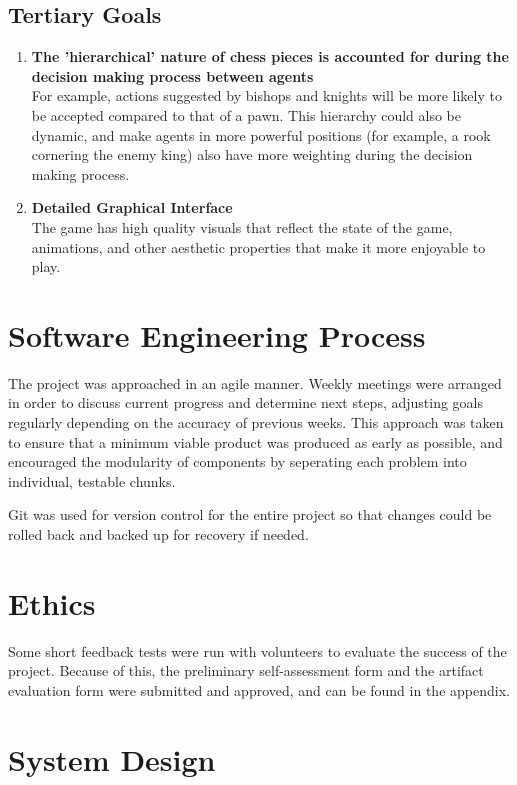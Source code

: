 \documentclass{article}
\newcommand\descitem[1]{\item{\bfseries #1}\\}
\begin{document}
\subsection*{Tertiary Goals}

\begin{enumerate}

		\descitem{The 'hierarchical' nature of chess pieces is accounted for during the decision making process between agents}
		For example, actions suggested by bishops and knights will be more likely to be accepted compared to that of a pawn. This hierarchy could also be dynamic, and make agents in more powerful positions (for example, a rook cornering the enemy king) also have more weighting during the decision making process.

		\descitem{Detailed Graphical Interface}
		The game has high quality visuals that reflect the state of the game, animations, and other aesthetic properties that make it more enjoyable to play.

\end{enumerate}

\clearpage

\section{Software Engineering Process}

The project was approached in an agile manner. Weekly meetings were arranged in order to discuss current progress and determine next steps, adjusting goals regularly depending on the accuracy of previous weeks. This approach was taken to ensure that a minimum viable product was produced as early as possible, and encouraged the modularity of components by seperating each problem into individual, testable chunks. 

Git was used for version control for the entire project so that changes could be rolled back and backed up for recovery if needed.

\section{Ethics}

Some short feedback tests were run with volunteers to evaluate the success of the project. Because of this, the preliminary self-assessment form and the artifact evaluation form were submitted and approved, and can be found in the appendix.

\section{System Design}
\end{document}
